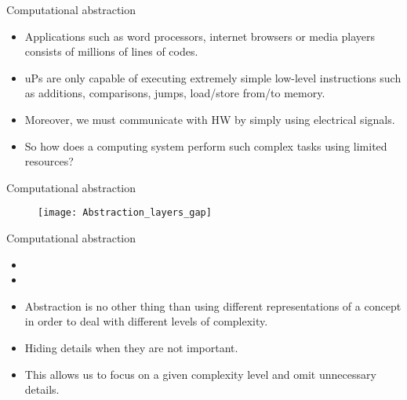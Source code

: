 \begin{frame}{Computational abstraction}
\begin{itemize}
\item Applications such as word processors, internet browsers or media players consists of millions of lines of codes.  
\item \acp{uP} are only capable of executing extremely simple low-level instructions such as additions, comparisons, jumps, load/store from/to memory.
\item Moreover, we must communicate with \ac{HW} by simply using electrical signals.
\pauseprint
\item So how does a computing system perform such complex tasks using limited resources?
\end{itemize}
\end{frame}

\begin{frame}{Computational abstraction}
\begin{figure}[!htb]
  \centering
  \texttt{[image: Abstraction\_layers\_gap]}
  \label{Figure:Abstraction_gap}
\end{figure}
\end{frame}

\begin{frame}{Computational abstraction}
  \begin{itemize}
  \item {}
  \pauseprint
  \item {}
  \pauseprint
  \item Abstraction is no other thing than using different representations of a concept in order to deal with different levels of complexity.
  \item Hiding details when they are not important.
  \item This allows us to focus on a given complexity level and omit unnecessary details.  
  \end{itemize}
\end{frame}


